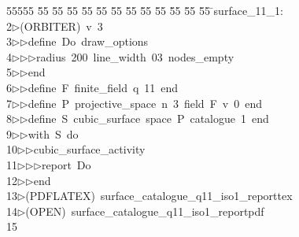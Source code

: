 %
%
\begin{tabbing}
55555 \= 55 \= 55 \= 55 \= 55 \= 55 \= 55 \= 55 \= 55 \= 55 \= 55 \= 55 \= 55 \= \>surface\_11\_1:\\[0pt]
2\>$\triangleright$\>(ORBITER)\ v\ 3\ \\[0pt]
3\>$\triangleright$\>$\triangleright$\>define\ Do\ draw\_options\ \\[0pt]
4\>$\triangleright$\>$\triangleright$\>$\triangleright$\>radius\ 200\ line\_width\ 03\ nodes\_empty\ \\[0pt]
5\>$\triangleright$\>$\triangleright$\>end\ \\[0pt]
6\>$\triangleright$\>$\triangleright$\>define\ F\ finite\_field\ q\ 11\ end\ \\[0pt]
7\>$\triangleright$\>$\triangleright$\>define\ P\ projective\_space\ n\ 3\ field\ F\ v\ 0\ end\ \\[0pt]
8\>$\triangleright$\>$\triangleright$\>define\ S\ cubic\_surface\ space\ P\ catalogue\ 1\ end\ \\[0pt]
9\>$\triangleright$\>$\triangleright$\>with\ S\ do\ \\[0pt]
10\>$\triangleright$\>$\triangleright$\>cubic\_surface\_activity\ \\[0pt]
11\>$\triangleright$\>$\triangleright$\>$\triangleright$\>report\ Do\ \\[0pt]
12\>$\triangleright$\>$\triangleright$\>end\\[0pt]
13\>$\triangleright$\>(PDFLATEX)\ surface\_catalogue\_q11\_iso1\_reporttex\\[0pt]
14\>$\triangleright$\>(OPEN)\ surface\_catalogue\_q11\_iso1\_reportpdf\\[0pt]
15\>\end{tabbing}
